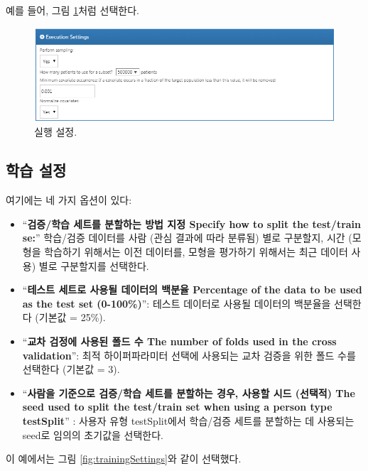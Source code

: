 \documentclass[10.5pt]{book}
\providecommand{\tightlist}{%
  \setlength{\itemsep}{0pt}\setlength{\parskip}{0pt}}
\theoremstyle{definition}
\theoremstyle{definition}
\theoremstyle{definition}
\theoremstyle{remark}
\begin{document}
예를 들어, 그림 \ref{fig:executionSettings}처럼 선택한다.

\begin{figure}

{\centering \includegraphics[width=1\linewidth]{images/PatientLevelPrediction/executionSettings} 

}

\caption{실행 설정.}\label{fig:executionSettings}
\end{figure}

\subsection{학습 설정}\label{-}

여기에는 네 가지 옵션이 있다:

\begin{itemize}
\tightlist
\item
  ``\textbf{검증/학습 세트를 분할하는 방법 지정 Specify how to split the
  test/train se:}'' 학습/검증 데이터를 사람 (관심 결과에 따라 분류됨)
  별로 구분할지, 시간 (모형을 학습하기 위해서는 이전 데이터를, 모형을
  평가하기 위해서는 최근 데이터 사용) 별로 구분할지를 선택한다.
\item
  ``\textbf{테스트 세트로 사용될 데이터의 백분율 Percentage of the data
  to be used as the test set (0-100\%)}'': 테스트 데이터로 사용될
  데이터의 백분율을 선택한다 (기본값 = 25\%).
\item
  ``\textbf{교차 검정에 사용된 폴드 수 The number of folds used in the
  cross validation}'': 최적 하이퍼파라미터 선택에 사용되는 교차 검증을
  위한 폴드 수를 선택한다 (기본값 = 3).
\item
  ``\textbf{사람을 기준으로 검증/학습 세트를 분할하는 경우, 사용할 시드
  (선택적) The seed used to split the test/train set when using a person
  type testSplit}'' : 사용자 유형 testSplit에서 학습/검증 세트를
  분할하는 데 사용되는 seed로 임의의 초기값을 선택한다.
\end{itemize}

이 예에서는 그림 \ref{fig:trainingSettings}와 같이 선택했다.
\end{document}
